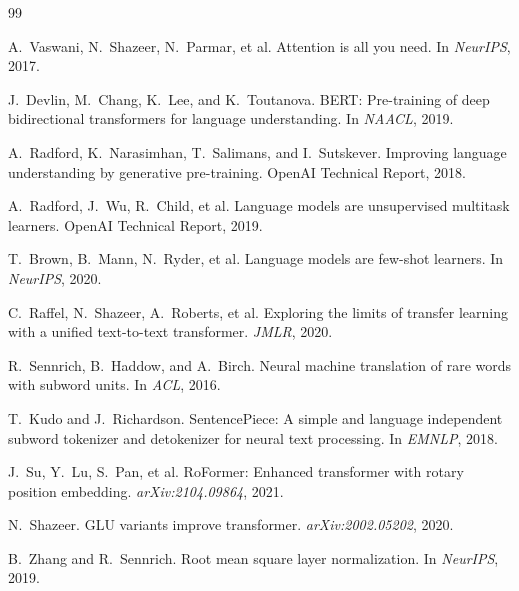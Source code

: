\documentclass[11pt,a4paper]{article}
\begin{document}

\begin{thebibliography}{99}

A.~Vaswani, N.~Shazeer, N.~Parmar, et al.
\newblock Attention is all you need.
\newblock In \emph{NeurIPS}, 2017.

J.~Devlin, M.~Chang, K.~Lee, and K.~Toutanova.
\newblock BERT: Pre-training of deep bidirectional transformers for language understanding.
\newblock In \emph{NAACL}, 2019.

A.~Radford, K.~Narasimhan, T.~Salimans, and I.~Sutskever.
\newblock Improving language understanding by generative pre-training.
\newblock OpenAI Technical Report, 2018.

A.~Radford, J.~Wu, R.~Child, et al.
\newblock Language models are unsupervised multitask learners.
\newblock OpenAI Technical Report, 2019.

T.~Brown, B.~Mann, N.~Ryder, et al.
\newblock Language models are few-shot learners.
\newblock In \emph{NeurIPS}, 2020.

C.~Raffel, N.~Shazeer, A.~Roberts, et al.
\newblock Exploring the limits of transfer learning with a unified text-to-text transformer.
\newblock \emph{JMLR}, 2020.

R.~Sennrich, B.~Haddow, and A.~Birch.
\newblock Neural machine translation of rare words with subword units.
\newblock In \emph{ACL}, 2016.

T.~Kudo and J.~Richardson.
\newblock SentencePiece: A simple and language independent subword tokenizer and detokenizer for neural text processing.
\newblock In \emph{EMNLP}, 2018.

J.~Su, Y.~Lu, S.~Pan, et al.
\newblock RoFormer: Enhanced transformer with rotary position embedding.
\newblock \emph{arXiv:2104.09864}, 2021.

N.~Shazeer.
\newblock GLU variants improve transformer.
\newblock \emph{arXiv:2002.05202}, 2020.

B.~Zhang and R.~Sennrich.
\newblock Root mean square layer normalization.
\newblock In \emph{NeurIPS}, 2019.


\end{thebibliography}
\end{document}
